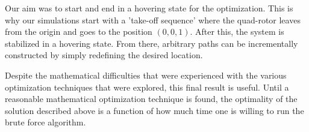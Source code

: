 Our aim was to start and end in a hovering state for the optimization. This is why our simulations start with a 'take-off sequence' where the quad-rotor leaves from the origin and goes to the position $(0,0,1)$. After this, the system is stabilized in a hovering state. From there, arbitrary paths can be incrementally constructed by simply redefining the desired location.

Despite the mathematical difficulties that were experienced with the various optimization techniques that were explored, this final result is useful. Until a reasonable mathematical optimization technique is found, the optimality of the solution described above is a function of how much time one is willing to run the brute force algorithm.































